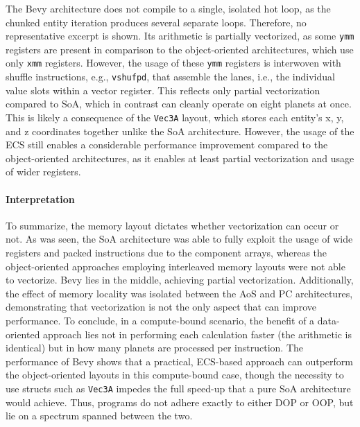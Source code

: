 The Bevy architecture does not compile to a single, isolated hot loop, as the chunked entity iteration produces several separate loops. Therefore, no representative excerpt is shown. Its arithmetic is partially vectorized, as some \texttt{ymm} registers are present in comparison to the object-oriented architectures, which use only \texttt{xmm} registers. However, the usage of these \texttt{ymm} registers is interwoven with shuffle instructions, e.g., \texttt{vshufpd}, that assemble the lanes, i.e., the individual value slots within a vector register. This reflects only partial vectorization compared to \ac{SoA}, which in contrast can cleanly operate on eight planets at once. This is likely a consequence of the \texttt{Vec3A} layout, which stores each entity's x, y, and z coordinates together unlike the \ac{SoA} architecture. However, the usage of the \ac{ECS} still enables a considerable performance improvement compared to the object-oriented architectures, as it enables at least partial vectorization and usage of wider registers. 

\paragraph{Interpretation}
To summarize, the memory layout dictates whether vectorization can occur or not. As was seen, the \ac{SoA} architecture was able to fully exploit the usage of wide registers and packed instructions due to the component arrays, whereas the object-oriented approaches employing interleaved memory layouts were not able to vectorize. Bevy lies in the middle, achieving partial vectorization. Additionally, the effect of memory locality was isolated between the \ac{AoS} and \ac{PC} architectures, demonstrating that vectorization is not the only aspect that can improve performance. To conclude, in a compute-bound scenario, the benefit of a data-oriented approach lies not in performing each calculation faster (the arithmetic is identical) but in how many planets are processed per instruction. The performance of Bevy shows that a practical, ECS-based approach can outperform the object-oriented layouts in this compute-bound case, though the necessity to use structs such as \texttt{Vec3A} impedes the full speed-up that a pure \ac{SoA} architecture would achieve. Thus, programs do not adhere exactly to either \ac{DOP} or \ac{OOP}, but lie on a spectrum spanned between the two. 

